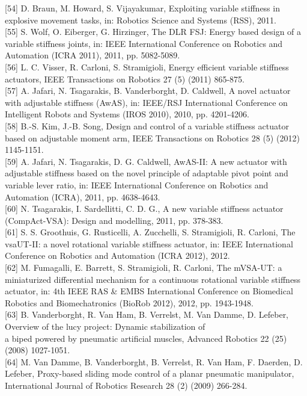 \documentclass[10pt]{article}
\begin{document}
[54] D. Braun, M. Howard, S. Vijayakumar, Exploiting variable stiffness in explosive movement tasks, in: Robotics Science and Systems (RSS), 2011.\\[0pt]
[55] S. Wolf, O. Eiberger, G. Hirzinger, The DLR FSJ: Energy based design of a variable stiffness joints, in: IEEE International Conference on Robotics and Automation (ICRA 2011), 2011, pp. 5082-5089.\\[0pt]
[56] L. C. Visser, R. Carloni, S. Stramigioli, Energy efficient variable stiffness actuators, IEEE Transactions on Robotics 27 (5) (2011) 865-875.\\[0pt]
[57] A. Jafari, N. Tsagarakis, B. Vanderborght, D. Caldwell, A novel actuator with adjustable stiffness (AwAS), in: IEEE/RSJ International Conference on Intelligent Robots and Systems (IROS 2010), 2010, pp. 4201-4206.\\[0pt]
[58] B.-S. Kim, J.-B. Song, Design and control of a variable stiffness actuator based on adjustable moment arm, IEEE Transactions on Robotics 28 (5) (2012) 1145-1151.\\[0pt]
[59] A. Jafari, N. Tsagarakis, D. G. Caldwell, AwAS-II: A new actuator with adjustable stiffness based on the novel principle of adaptable pivot point and variable lever ratio, in: IEEE International Conference on Robotics and Automation (ICRA), 2011, pp. 4638-4643.\\[0pt]
[60] N. Tsagarakis, I. Sardellitti, C. D. G., A new variable stiffness actuator (CompAct-VSA): Design and modelling, 2011, pp. 378-383.\\[0pt]
[61] S. S. Groothuis, G. Rusticelli, A. Zucchelli, S. Stramigioli, R. Carloni, The vsaUT-II: a novel rotational variable stiffness actuator, in: IEEE International Conference on Robotics and Automation (ICRA 2012), 2012.\\[0pt]
[62] M. Fumagalli, E. Barrett, S. Stramigioli, R. Carloni, The mVSA-UT: a miniaturized differential mechanism for a continuous rotational variable stiffness actuator, in: 4th IEEE RAS \& EMBS International Conference on Biomedical Robotics and Biomechatronics (BioRob 2012), 2012, pp. 1943-1948.\\[0pt]
[63] B. Vanderborght, R. Van Ham, B. Verrelst, M. Van Damme, D. Lefeber, Overview of the lucy project: Dynamic stabilization of\\
a biped powered by pneumatic artificial muscles, Advanced Robotics 22 (25) (2008) 1027-1051.\\[0pt]
[64] M. Van Damme, B. Vanderborght, B. Verrelst, R. Van Ham, F. Daerden, D. Lefeber, Proxy-based sliding mode control of a planar pneumatic manipulator, International Journal of Robotics Research 28 (2) (2009) 266-284.\\[0pt]
\end{document}
